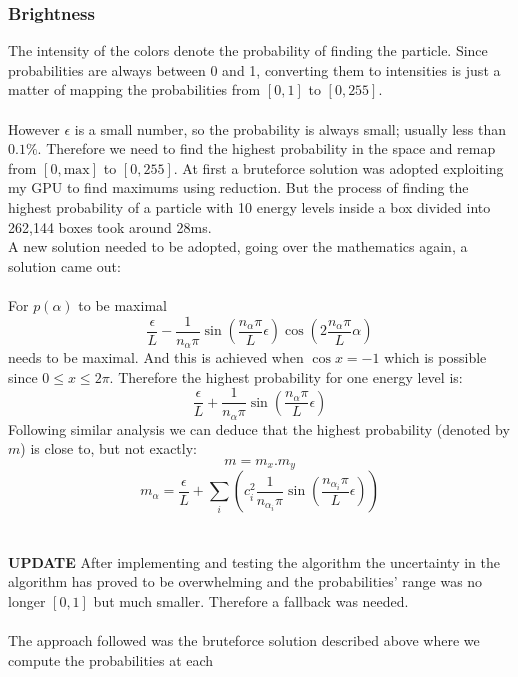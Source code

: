 \documentclass[a4paper, 10pt]{article}
\begin{document}
        \subsubsection{Brightness} \label{sec:brightness}
        \label{sec:brightness}
        The intensity of the colors denote the probability of finding the particle. Since
        probabilities are always between 0 and 1, converting them to intensities is just
        a matter of mapping the probabilities from $[0, 1]$ to $[0, 255]$.\\\\
        However $\epsilon$ is a small number, so the probability is always small; usually
        less than $0.1\%$. Therefore we need to find the highest probability in the space
        and remap from $[0, \text{max}]$ to $[0, 255]$. At first a bruteforce solution was adopted
        exploiting my GPU to find maximums using reduction. But
        the process of finding the highest probability of a particle with 10 energy levels
        inside a box divided into 262,144 boxes took around 28ms.\\
        A new solution needed to be adopted, going over the mathematics again, a solution came out:\\\\
        For $p(\alpha)$ to be maximal
        $$\frac{\epsilon}{L} - \frac{1}{n_{\alpha}\pi} \sin\left(\frac{n_{\alpha}\pi}{L}\epsilon\right)
        \cos\left(2\frac{n_{\alpha}\pi}{L}\alpha\right)$$
        needs to be maximal.  And this is achieved when $\cos{x} = -1$ which is possible
        since $0 \leq x \leq 2\pi$. Therefore the highest probability for one energy
        level is: 
        $$\frac{\epsilon}{L} + \frac{1}{n_{\alpha}\pi} \sin(\frac{n_{\alpha}\pi}{L}\epsilon)$$
        Following similar analysis we can deduce that the highest probability (denoted by
        $m$) is close to, but not exactly:
        $$m = m_x . m_y$$
        $$m_{\alpha} = \frac{\epsilon}{L} + \sum_i \left ( c^2_i \frac{1}{n_{\alpha_i}\pi}
        \sin\left(\frac{n_{\alpha_i}\pi}{L}\epsilon\right) \right )$$\\\\
        \textbf{UPDATE} After implementing and testing the algorithm the uncertainty in the algorithm
        has proved to be overwhelming and the probabilities' range was no longer $[0, 1]$ but much smaller.
        Therefore a fallback was needed.\\\\
        The approach followed was the bruteforce solution described above where we compute the probabilities at each
\end{document}
